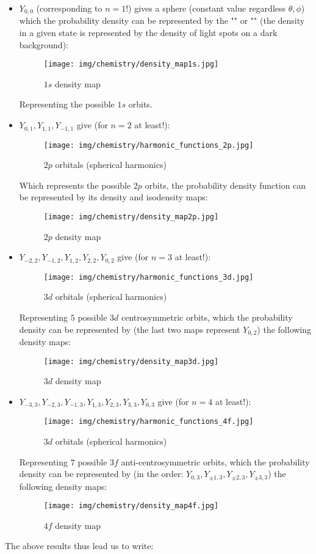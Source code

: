 	\begin{itemize}
		\item $Y_{0,0}$ (corresponding to $n=1$!) gives a sphere (constant value regardless $\theta,\phi$) which the probability density can be represented by the "" or "" (the density in a given state is represented by the density of light spots on a dark background):
		\begin{figure}[H]
			\centering
			\texttt{[image: img/chemistry/density\_map1s.jpg]}	
			\caption{$1s$ density map}
		\end{figure}
		Representing the possible $1s$ orbits.

		\item $Y_{0,1},Y_{1,1},Y_{-1,1}$ give (for $n=2$  at least!):
		\begin{figure}[H]
			\centering
			\texttt{[image: img/chemistry/harmonic\_functions\_2p.jpg]}	
			\caption{$2p$ orbitals (spherical harmonics)}
		\end{figure}
		Which represents the possible $2p$ orbits, the probability density function can be represented by its density and isodensity maps:
		\begin{figure}[H]
			\centering
			\texttt{[image: img/chemistry/density\_map2p.jpg]}	
			\caption{$2p$ density map}
		\end{figure}

		\item $Y_{-2,2},Y_{-1,2},Y_{1,2},Y_{2,2},Y_{0,2}$ give (for $n=3$  at least!):
		\begin{figure}[H]
			\centering
			\texttt{[image: img/chemistry/harmonic\_functions\_3d.jpg]}	
			\caption{$3d$ orbitals (spherical harmonics)}
		\end{figure}
		Representing $5$ possible $3d$ centrosymmetric  orbits, which the probability density can be represented by (the last two maps represent $Y_{0,2}$) the following density maps:
		\begin{figure}[H]
			\centering
			\texttt{[image: img/chemistry/density\_map3d.jpg]}	
			\caption{$3d$ density map}
		\end{figure}

		\item $Y_{-3,3},Y_{-2,3},Y_{-1,3},Y_{1,3},Y_{2,3},Y_{3,3},Y_{0,3}$ give (for $n=4$  at least!):
		\begin{figure}[H]
			\centering
			\texttt{[image: img/chemistry/harmonic\_functions\_4f.jpg]}	
			\caption{$3d$ orbitals (spherical harmonics)}
		\end{figure}
		Representing $7$ possible $3f$ anti-centrosymmetric  orbits, which the probability density can be represented by (in the order: $Y_{0,3},Y_{\pm 1,3},Y_{\pm 2,3},Y_{\pm 3,3}$) the following density maps:
		\begin{figure}[H]
			\centering
			\texttt{[image: img/chemistry/density\_map4f.jpg]}	
			\caption{$4f$ density map}
		\end{figure}
	\end{itemize}
	The above results thus lead us to write:
	
